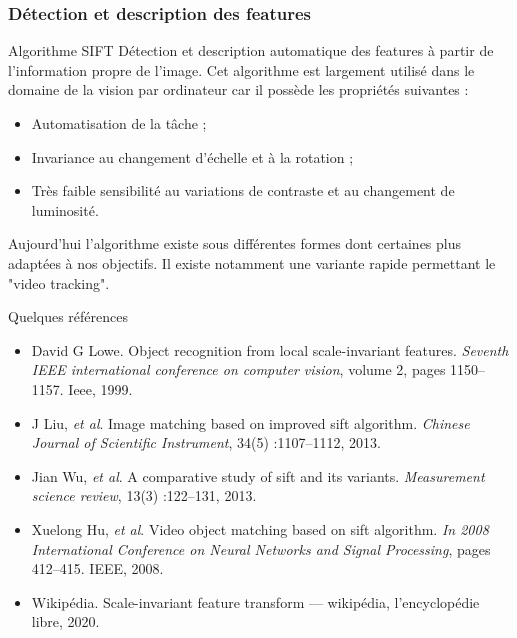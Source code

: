 \documentclass[8pt]{beamer}
\begin{document}
	\begin{frame}
		\frametitle{Détection et description des features}
		\begin{block}{Algorithme SIFT}
			Détection et description automatique des features à partir de l'information propre de l'image. Cet algorithme est largement utilisé dans le domaine de la vision par ordinateur car il possède les propriétés suivantes :
			\begin{itemize}
				\item Automatisation de la tâche ;
				\item Invariance au changement d'échelle et à la rotation ;
				\item Très faible sensibilité au variations de contraste et au changement de luminosité.
			\end{itemize}
			Aujourd'hui l'algorithme existe sous différentes formes dont certaines plus adaptées à nos objectifs. Il existe notamment une variante rapide permettant le "video tracking".
		\end{block}
		\begin{exampleblock}{Quelques références}
			{\small
				\begin{itemize}
					\item David G Lowe. Object recognition from local scale-invariant features. \textit{Seventh IEEE international conference on computer vision}, volume 2, pages 1150–1157. Ieee, 1999.
					\item J Liu, \textit{et al}. Image matching based on improved sift algorithm. \textit{Chinese Journal of Scientific Instrument}, 34(5) :1107–1112, 2013.
					\item Jian Wu, \textit{et al}. A comparative study of sift and its variants. \textit{Measurement science review}, 13(3) :122–131, 2013.
					\item Xuelong Hu, \textit{et al}. Video object matching based on sift algorithm. \textit{In 2008 International Conference on Neural Networks and Signal Processing}, pages 412–415. IEEE,
					2008.
					\item Wikipédia. Scale-invariant feature transform — wikipédia, l’encyclopédie libre, 2020.
			\end{itemize}}
		\end{exampleblock}
	\end{frame}
\end{document}
